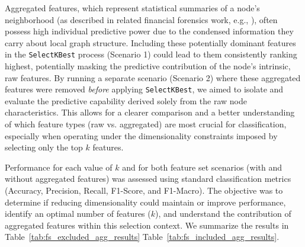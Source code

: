 \documentclass[12pt]{article}
\begin{document}
Aggregated features, which represent statistical summaries of a node's neighborhood (as described in related financial forensics
work, e.g., \cite{weber2019antimoneylaunderingbitcoinexperimenting}), often possess high individual predictive power due
to the condensed information they carry about local graph structure. Including these potentially dominant features in the
\texttt{SelectKBest} process (Scenario 1) could lead to them consistently ranking highest, potentially masking the predictive
contribution of the node's intrinsic, raw features. By running a separate scenario (Scenario 2) where these aggregated
features were removed \textit{before} applying \texttt{SelectKBest}, we aimed to isolate and evaluate the predictive
capability derived solely from the raw node characteristics. This allows for a clearer comparison and a better understanding
of which feature types (raw vs. aggregated) are most crucial for classification, especially when operating under the
dimensionality constraints imposed by selecting only the top $k$ features.

Performance for each value of $k$ and for both feature set scenarios (with and without aggregated features) was assessed
using standard classification metrics (Accuracy, Precision, Recall, F1-Score, and F1-Macro). The objective was to
determine if reducing dimensionality could maintain or improve performance, identify an optimal number of features ($k$),
and understand the contribution of aggregated features within this selection context.
We summarize the results in Table~\ref{tab:fs_excluded_agg_results} Table~\ref{tab:fs_included_agg_results}.
\end{document}

